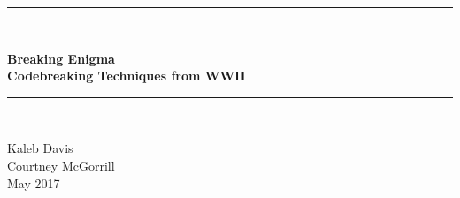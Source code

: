 
\begin{titlepage}
\begin{center}

\newcommand{\HorizontalLine}{\rule{\linewidth}{0.3mm}}


\HorizontalLine \\[0.4cm]
\begin{spacing}{3}
    {\huge \bfseries Breaking Enigma}\\
    {\huge \bfseries Codebreaking Techniques from WWII}\\
\end{spacing}
\HorizontalLine \\[1.5cm]


\vfill  %

\Large {
    Kaleb Davis\\
    Courtney McGorrill\\
    May 2017
}
\end{center}
\end{titlepage}

